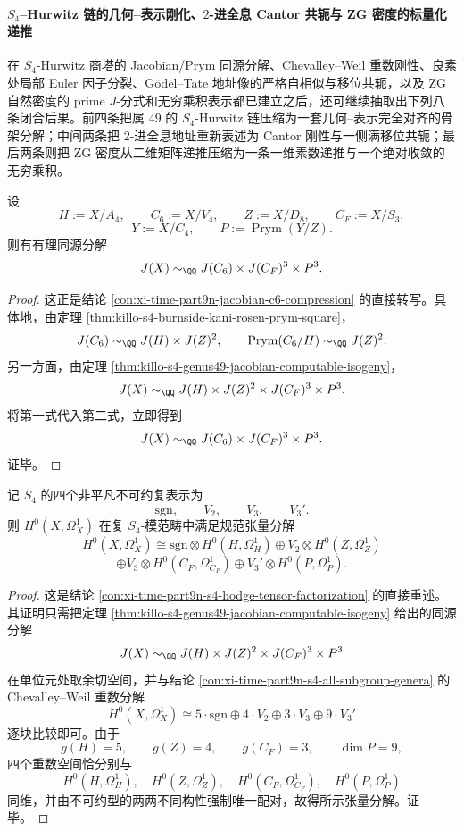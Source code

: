 \paragraph{\texorpdfstring{$S_4$}{S4}--Hurwitz 链的几何--表示刚化、\texorpdfstring{$2$}{2}-进全息 Cantor 共轭与 ZG 密度的标量化递推}
在 \(S_4\)-Hurwitz 商塔的 Jacobian/Prym 同源分解、Chevalley--Weil 重数刚性、良素处局部 Euler 因子分裂、Gödel--Tate 地址像的严格自相似与移位共轭，以及 ZG 自然密度的 prime \(J\)-分式和无穷乘积表示都已建立之后，还可继续抽取出下列八条闭合后果。前四条把属 \(49\) 的 \(S_4\)-Hurwitz 链压缩为一套几何--表示完全对齐的骨架分解；中间两条把 \(2\)-进全息地址重新表述为 Cantor 刚性与一侧满移位共轭；最后两条则把 ZG 密度从二维矩阵递推压缩为一条一维素数递推与一个绝对收敛的无穷乘积。

\begin{theorem}\label{thm:xi-time-part9y-s4-jacobian-skeleton-compression}
设
\[
H:=X/A_4,\qquad
C_6:=X/V_4,\qquad
Z:=X/D_8,\qquad
C_F:=X/S_3,
\]
\[
Y:=X/C_4,
\qquad
P:=\operatorname{Prym}(Y/Z).
\]
则有有理同源分解
\[
J(X)\sim_{\QQ}J(C_6)\times J(C_F)^3\times P^3.
\]
\end{theorem}
\begin{proof}
这正是结论 \ref{con:xi-time-part9n-jacobian-c6-compression} 的直接转写。具体地，由定理 \ref{thm:killo-s4-burnside-kani-rosen-prym-square}，
\[
J(C_6)\sim_{\QQ}J(H)\times J(Z)^2,
\qquad
\operatorname{Prym}(C_6/H)\sim_{\QQ}J(Z)^2.
\]
另一方面，由定理 \ref{thm:killo-s4-genus49-jacobian-computable-isogeny}，
\[
J(X)\sim_{\QQ}J(H)\times J(Z)^2\times J(C_F)^3\times P^3.
\]
将第一式代入第二式，立即得到
\[
J(X)\sim_{\QQ}J(C_6)\times J(C_F)^3\times P^3.
\]
证毕。
\end{proof}

\begin{theorem}\label{thm:xi-time-part9y-s4-hodge-geometric-representation-rigidification}
记 \(S_4\) 的四个非平凡不可约复表示为
\[
\mathrm{sgn},\qquad V_2,\qquad V_3,\qquad V_3'.
\]
则 \(H^0(X,\Omega_X^1)\) 在复 \(S_4\)-模范畴中满足规范张量分解
\[
H^0(X,\Omega_X^1)
\cong
\mathrm{sgn}\otimes H^0(H,\Omega_H^1)
\oplus
V_2\otimes H^0(Z,\Omega_Z^1)
\]
\[
\oplus
V_3\otimes H^0(C_F,\Omega_{C_F}^1)
\oplus
V_3'\otimes H^0(P,\Omega_P^1).
\]
\end{theorem}
\begin{proof}
这是结论 \ref{con:xi-time-part9n-s4-hodge-tensor-factorization} 的直接重述。其证明只需把定理 \ref{thm:killo-s4-genus49-jacobian-computable-isogeny} 给出的同源分解
\[
J(X)\sim_{\QQ}J(H)\times J(Z)^2\times J(C_F)^3\times P^3
\]
在单位元处取余切空间，并与结论 \ref{con:xi-time-part9n-s4-all-subgroup-genera} 的 Chevalley--Weil 重数分解
\[
H^0(X,\Omega_X^1)\cong
5\cdot \mathrm{sgn}\oplus
4\cdot V_2\oplus
3\cdot V_3\oplus
9\cdot V_3'
\]
逐块比较即可。由于
\[
g(H)=5,\qquad g(Z)=4,\qquad g(C_F)=3,\qquad \dim P=9,
\]
四个重数空间恰分别与
\[
H^0(H,\Omega_H^1),\quad H^0(Z,\Omega_Z^1),\quad H^0(C_F,\Omega_{C_F}^1),\quad H^0(P,\Omega_P^1)
\]
同维，并由不可约型的两两不同构性强制唯一配对，故得所示张量分解。证毕。
\end{proof}

